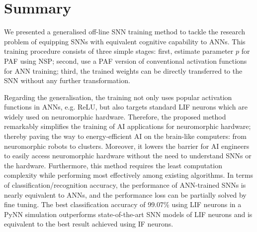 \section{Summary}
	We presented a generalised off-line SNN training method to tackle the research problem of equipping SNNs with equivalent cognitive capability to ANNs.
	This training procedure consists of three simple stages: first, estimate parameter $p$ for PAF using NSP; second, use a PAF version of conventional activation functions for ANN training; %
	third, the trained weights can be directly transferred to the SNN without any further transformation.
	\DIFdelbegin {}\DIFdelend 

	
	
	Regarding the generalisation, the training not only uses popular activation functions in ANNs, e.g. ReLU, but also targets standard LIF neurons which are widely used on neuromorphic hardware.
	Therefore, the proposed method remarkably simplifies the training of AI applications for neuromorphic hardware;
	thereby paving the way to energy-efficient AI on the brain-like computers: from neuromorphic robots to clusters.
	Moreover, it lowers the barrier for AI engineers to easily access neuromorphic hardware without the need to understand SNNs or the hardware.
	Furthermore, this method requires the least computation complexity while performing most effectively among existing algorithms.
	In terms of classification/recognition accuracy, the performance of ANN-trained SNNs is nearly equivalent to ANNs, and the performance loss can be partially solved by fine tuning.
	The best classification accuracy of 99.07\% using LIF neurons in a PyNN simulation outperforms state-of-the-art SNN models of LIF neurons and is equivalent to the best result achieved using IF neurons\DIFaddbegin {}\DIFaddend .
